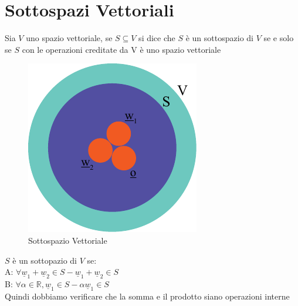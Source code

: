 \chapter{Sottospazi Vettoriali}

Sia $V$ uno spazio vettoriale, se $S\subseteq V$ si dice che $S$ è un
sottospazio di $V$ se e solo se $S$ con le operazioni creditate da V
è uno spazio vettoriale
\begin{figure}[H]
  \centering
  \includegraphics[height=0.28\textwidth]{Figures/sottospazio vettoriale.pdf}
  \caption[Caption]{Sottospazio Vettoriale}
  \label{fig:sottospaziovettoriale}
\end{figure}

\begin{definizione}
  $S$ è un sottopazio di $V$ se:\\
  A: $\forall \underline{w}_1+\underline{w}_2\in S -
  \underline{w}_1+\underline{w}_2\in S$\\
  B: $\forall\alpha\in\mathbb{R}, \underline{w}_1\in S -
  \alpha\underline{w}_1\in S$\\
  Quindi dobbiamo verificare che la somma e il prodotto siano operazioni interne
\end{definizione}

